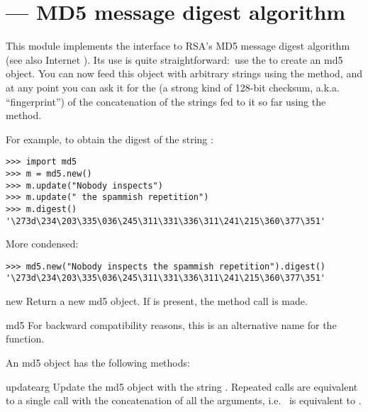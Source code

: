 \section{ ---
         MD5 message digest algorithm}



This module implements the interface to RSA's MD5 message digest
algorithm (see also Internet ).  Its use is quite
straightforward:\ use the  to create an md5 object.
You can now feed this object with arbitrary strings using the
 method, and at any point you can ask it for the
 (a strong kind of 128-bit checksum,
a.k.a. ``fingerprint'') of the concatenation of the strings fed to it
so far using the  method.

For example, to obtain the digest of the string :

\begin{verbatim}
>>> import md5
>>> m = md5.new()
>>> m.update("Nobody inspects")
>>> m.update(" the spammish repetition")
>>> m.digest()
'\273d\234\203\335\036\245\311\331\336\311\241\215\360\377\351'
\end{verbatim}

More condensed:

\begin{verbatim}
>>> md5.new("Nobody inspects the spammish repetition").digest()
'\273d\234\203\335\036\245\311\331\336\311\241\215\360\377\351'
\end{verbatim}

\begin{funcdesc}{new}{}
Return a new md5 object.  If  is present, the method call
 is made.
\end{funcdesc}

\begin{funcdesc}{md5}{}
For backward compatibility reasons, this is an alternative name for the
 function.
\end{funcdesc}

An md5 object has the following methods:

\begin{methoddesc}[md5]{update}{arg}
Update the md5 object with the string .  Repeated calls are
equivalent to a single call with the concatenation of all the
arguments, i.e.\  is equivalent to
.
\end{methoddesc}

